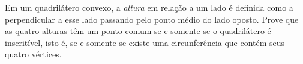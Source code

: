 Em um quadrilátero convexo, a \textit{altura} em relação a um lado é definida como a perpendicular a esse lado passando pelo ponto médio do lado oposto.
Prove que as quatro alturas têm um ponto comum se e somente se o quadrilátero é inscritível, isto é, se e somente se existe uma circunferência que contém
seus quatro vértices.